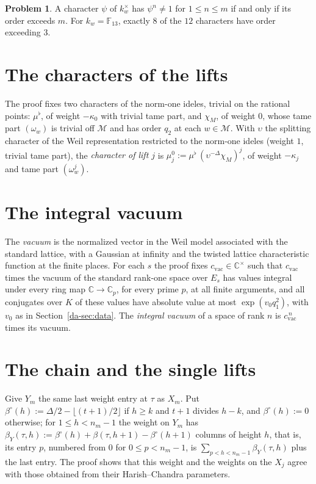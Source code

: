 \documentclass[reqno]{amsart}
\theoremstyle{plain}
\theoremstyle{definition}
\newtheorem{problem}{Problem}[section]
\newcommand{\C}{{\mathbb{C}}}
\begin{document}
\begin{problem}\label{pr:mfold}
A character \(\psi\) of \(k_w^\times\) has \(\psi^n \ne 1\) for \(1 \le n \le m\) if and only if its order exceeds \(m\).  For \(k_w = \mathbb F_{13}\), exactly \(8\) of the \(12\) characters have order exceeding \(3\).
\end{problem}

\section{The characters of the lifts}\label{sec:characters}

The proof fixes two characters of the norm-one ideles, trivial on the rational points: \(\mu^\flat\), of weight \(-\kappa_0\) with trivial tame part, and \(\chi_M\), of weight \(0\), whose tame part \((\omega_w)\) is trivial off \(\mathcal M\) and has order \(q_2\) at each \(w \in \mathcal M\).  With \(\upsilon\) the splitting character of the Weil representation restricted to the norm-one ideles (weight \(1\), trivial tame part), the \emph{character of lift \(j\)} is \(\mu_j^0 := \mu^\flat\,(\upsilon^{-\Delta}\chi_M)^j\), of weight \(-\kappa_j\) and tame part \((\omega_w^j)\).

\section{The integral vacuum}\label{sec:vacuum}

The \emph{vacuum} is the normalized vector in the Weil model associated with the standard lattice, with a Gaussian at infinity and the twisted lattice characteristic function at the finite places.  For each \(s\) the proof fixes \(c_{\mathrm{vac}} \in \C^\times\) such that \(c_{\mathrm{vac}}\) times the vacuum of the standard rank-one space over \(E_s\) has values integral under every ring map \(\C \to \C_p\), for every prime \(p\), at all finite arguments, and all conjugates over \(K\) of these values have absolute value at most \(\exp(v_0 q_1^2)\), with \(v_0\) as in Section~\ref{da-sec:data}.  The \emph{integral vacuum} of a space of rank \(n\) is \(c_{\mathrm{vac}}^{\,n}\) times its vacuum.

\section{The chain and the single lifts}\label{sec:chain}

Give \(Y_m\) the same last weight entry at \(\tau\) as \(X_m\).  Put \(\beta^\circ(h) := \Delta/2 - \lfloor (t+1)/2 \rfloor\) if \(h \ge k\) and \(t + 1\) divides \(h - k\), and \(\beta^\circ(h) := 0\) otherwise; for \(1 \le h < n_m - 1\) the weight on \(Y_m\) has \(\beta_Y(\tau, h) := \beta^\circ(h) + \beta(\tau, h+1) - \beta^\circ(h+1)\) columns of height \(h\), that is, its entry \(p\), numbered from \(0\) for \(0 \le p < n_m - 1\), is \(\sum_{p < h < n_m - 1} \beta_Y(\tau, h)\) plus the last entry.  The proof shows that this weight and the weights on the \(X_j\) agree with those obtained from their Harish--Chandra parameters.
\end{document}
